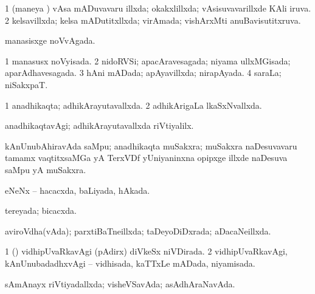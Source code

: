 {{\bentry
{} 
\gl{\gu}
\expl{}
\bmng
\bnum
\num{1} (maneya \vi) vAsa mADuvavaru illxda; okakxlillxda; vAsisuvavarillxde KAli iruva. 
\num{2} kelsavillxda; kelsa mADutitxllxda; virAmada; vishArxMti anuBavisutitxruva. 
\enum
\emng
\eentry

\bentry
{} 
\gl{\gu}
\expl{}
\bmng
manasisxge noVvAgada. 
\emng
\eentry

\bentry
{} 
\gl{\gu}
\expl{}
\bmng
\bnum
\num{1} manasusx noVyisada. 
\num{2} nidoRVSi; apacAravesagada; niyama ullxMGisada; aparAdhavesagada. 
\num{3} hAni mADada; apAyavillxda; nirapAyada. 
\num{4} saraLa; niSakxpaT. 
\enum
\emng
\eentry

\bentry
{} 
\gl{\gu}
\expl{}
\bmng
\bnum
\num{1} anadhikaqta; adhikArayutavallxda. 
\num{2} adhikArigaLa lkaSxNvallxda. 
\enum
\emng
\eentry

\bentry
{} 
\gl{\kirxvi}
\expl{}
\bmng
anadhikaqtavAgi; adhikArayutavallxda riVtiyalilx. 
\emng
\eentry

\bentry
{}
\gl{\nA}
\expl{}
\bmng
kAnUnubAhiravAda saMpu; anadhikaqta muSakxra; muSakxra naDesuvavaru tamamx vaqtitxsaMGa yA TerxVDf yUniyaninxna opipxge illxde naDesuva saMpu yA muSakxra. 
\emng
\eentry

\bentry
{} 
\gl{\gu}
\bmng
eNeNx -- hacacxda, baLiyada, hAkada. 
\emng
\eentry

\bentry
{} 
\gl{\gu}
\expl{}
\bmng
tereyada; bicacxda. 
\emng
\eentry

\bentry
{} 
\gl{\gu}
\expl{}
\bmng
aviroVdha(vAda); parxtiBaTneillxda; taDeyoDiDxrada; aDacaNeillxda. 
\emng
\eentry

\bentry
{} 
\gl{\gu}
\expl{}
\bmng
\bnum
\num{1} (\kerxY) vidhipUvaRkavAgi (pAdirx) diVkeSx niVDirada. 
\num{2} vidhipUvaRkavAgi, kAnUnubadadhxvAgi -- vidhisada, kaTTxLe mADada, niyamisada. 
\enum
\emng
\eentry

\bentry
{} 
\gl{\gu}
\expl{}
\bmng
sAmAnayx riVtiyadallxda; visheVSavAda; asAdhAraNavAda. 
\emng
\eentry

\bentry
{} 
\gl{\gu}
\expl{}
\bmng
{} 
\emng
\eentry

}}
